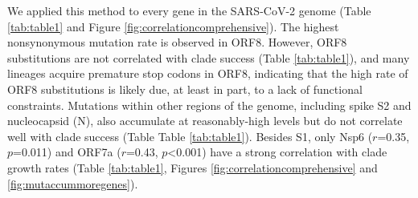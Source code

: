 \documentclass[11pt,oneside,letterpaper]{article}
\begin{document}
We applied this method to every gene in the SARS-CoV-2 genome (Table \ref{tab:table1} and Figure \ref{fig:correlationcomprehensive}). The highest nonsynonymous mutation rate is observed in ORF8. 
However, ORF8 substitutions are not correlated with clade success (Table \ref{tab:table1}), and many lineages acquire premature stop codons in ORF8, indicating that the high rate of ORF8 substitutions is likely due, at least in part, to a lack of functional constraints. 
Mutations within other regions of the genome, including spike S2 and nucleocapsid (N), also accumulate at reasonably-high levels but do not correlate well with clade success (Table Table \ref{tab:table1}). 
Besides S1, only Nsp6 ($r$=0.35, $p$=0.011) and ORF7a ($r$=0.43, $p$\textless0.001) have a strong correlation with clade growth rates (Table \ref{tab:table1}, Figures \ref{fig:correlationcomprehensive} and \ref{fig:mutaccummoregenes}).
\end{document}
